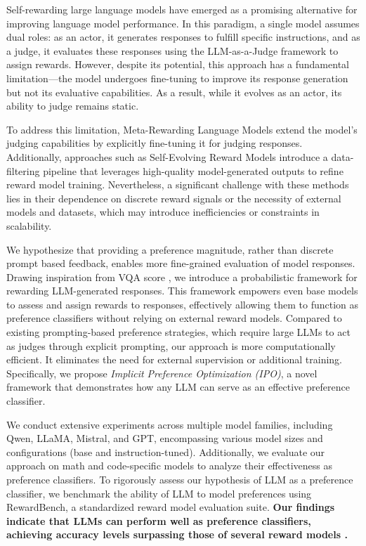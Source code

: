 Self-rewarding large language models  \citep{yuan2024selfrewarding} have emerged as a promising alternative for improving language model performance. In this paradigm, a single model assumes dual roles: as an actor, it generates responses to fulfill specific instructions, and as a judge, it evaluates these responses using the LLM-as-a-Judge framework \citep{zheng2023judging} to assign rewards. However, despite its potential, this approach has a fundamental limitation—the model undergoes fine-tuning to improve its response generation but not its evaluative capabilities. As a result, while it evolves as an actor, its ability to judge remains static.

To address this limitation, Meta-Rewarding Language Models \citep{wu2024meta} extend the model's judging capabilities by explicitly fine-tuning it for judging responses. Additionally, approaches such as Self-Evolving Reward Models \citep{huang2024self} introduce a data-filtering pipeline that leverages high-quality model-generated outputs to refine reward model training. Nevertheless, a significant challenge with these methods lies in their dependence on discrete reward signals or the necessity of external models and datasets, which may introduce inefficiencies or constraints in scalability.

We hypothesize that providing a preference magnitude, rather than discrete prompt based feedback, enables more fine-grained evaluation of model responses. Drawing inspiration from VQA score \citep{lin2025evaluating}, we introduce a probabilistic framework for rewarding LLM-generated responses. This framework empowers even base models to assess and assign rewards to responses, effectively allowing them to function as preference classifiers without relying on external reward models. Compared to existing prompting-based preference strategies, which require large LLMs to act as judges through explicit prompting, our approach is more computationally efficient. It eliminates the need for external supervision or additional training. Specifically, we propose \textit{Implicit Preference Optimization (IPO)}, a novel framework that demonstrates how any LLM can serve as an effective preference classifier.

We conduct extensive experiments across multiple model families, including Qwen, LLaMA, Mistral, and GPT, encompassing various model sizes and configurations (base and instruction-tuned). Additionally, we evaluate our approach on math and code-specific models to analyze their effectiveness as preference classifiers. To rigorously assess our hypothesis of LLM as a preference classifier, we benchmark the ability of LLM to model preferences using RewardBench, a standardized reward model evaluation suite. \textbf{Our findings indicate that LLMs can perform well as preference classifiers, achieving accuracy levels surpassing those of several reward models \citep{lambert2024rewardbenchevaluatingrewardmodels}.} 


